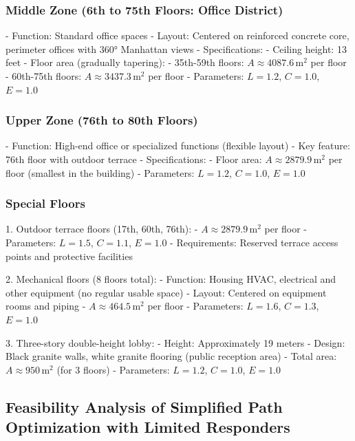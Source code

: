 \subsubsection{Middle Zone (6th to 75th Floors: Office District)}
- Function: Standard office spaces
- Layout: Centered on reinforced concrete core, perimeter offices with 360° Manhattan views
- Specifications:
  - Ceiling height: 13 feet
  - Floor area (gradually tapering):
    - 35th-59th floors: \( A \approx 4087.6 \, \text{m}^2 \) per floor
    - 60th-75th floors: \( A \approx 3437.3 \, \text{m}^2 \) per floor
- Parameters: \( L = 1.2 \), \( C = 1.0 \), \( E = 1.0 \)

\subsubsection{Upper Zone (76th to 80th Floors)}
- Function: High-end office or specialized functions (flexible layout)
- Key feature: 76th floor with outdoor terrace
- Specifications:
  - Floor area: \( A \approx 2879.9 \, \text{m}^2 \) per floor (smallest in the building)
- Parameters: \( L = 1.2 \), \( C = 1.0 \), \( E = 1.0 \)

\subsubsection{Special Floors}
1. Outdoor terrace floors (17th, 60th, 76th):
   - \( A \approx 2879.9 \, \text{m}^2 \) per floor
   - Parameters: \( L = 1.5 \), \( C = 1.1 \), \( E = 1.0 \)
   - Requirements: Reserved terrace access points and protective facilities

2. Mechanical floors (8 floors total):
   - Function: Housing HVAC, electrical and other equipment (no regular usable space)
   - Layout: Centered on equipment rooms and piping
   - \( A \approx 464.5 \, \text{m}^2 \) per floor
   - Parameters: \( L = 1.6 \), \( C = 1.3 \), \( E = 1.0 \)

3. Three-story double-height lobby:
   - Height: Approximately 19 meters
   - Design: Black granite walls, white granite flooring (public reception area)
   - Total area: \( A \approx 950 \, \text{m}^2 \) (for 3 floors)
   - Parameters: \( L = 1.2 \), \( C = 1.0 \), \( E = 1.0 \)
   

\subsection{Feasibility Analysis of Simplified Path Optimization with Limited Responders}

